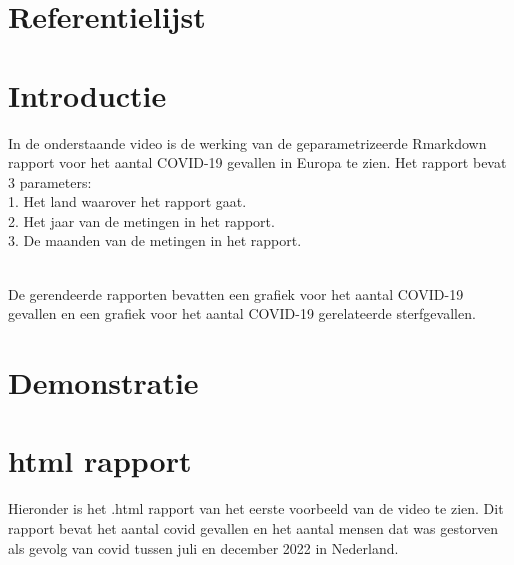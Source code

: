 \documentclass[
]{book}
\begin{document}
\section{Referentielijst}\label{referentielijst}

\section{Introductie}\label{introductie-2}

In de onderstaande video is de werking van de geparametrizeerde Rmarkdown rapport voor het aantal COVID-19 gevallen in Europa te zien. Het rapport bevat 3 parameters:\\
1. Het land waarover het rapport gaat.\\
2. Het jaar van de metingen in het rapport.\\
3. De maanden van de metingen in het rapport.\\
\strut \\
De gerendeerde rapporten bevatten een grafiek voor het aantal COVID-19 gevallen en een grafiek voor het aantal COVID-19 gerelateerde sterfgevallen.

\hfill\break

\section{Demonstratie}\label{demonstratie}

\hfill\break

\section{html rapport}\label{html-rapport}

Hieronder is het .html rapport van het eerste voorbeeld van de video te zien. Dit rapport bevat het aantal covid gevallen en het aantal mensen dat was gestorven als gevolg van covid tussen juli en december 2022 in Nederland.


\end{document}
